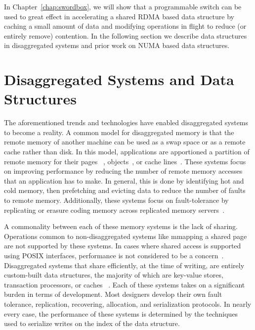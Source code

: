 \documentclass[12pt]{ucsddissertation}
\begin{document}
In Chapter~\ref{chap:swordbox}, we will show that a programmable switch can be used to great effect
in accelerating a shared RDMA based data structure by caching a small amount of data and modifying
operations in flight to reduce (or entirely remove) contention. In the following section we describe
data structures in disaggregated systems and prior work on NUMA based data structures.




\section{Disaggregated Systems and Data Structures}
\label{sec:disaggregated-data-structures}


The aforementioned trends and technologies have enabled disaggregated systems to become a reality. A
common model for disaggregated memory is that the remote memory of another machine can be used as a
swap space or as a remote cache rather than disk. In this model, applications are apportioned a
partition of remote memory for their pages
~\cite{fastswap,infiniswap,hydra,blade-server,leap,legoos}, objects~\cite{aifm,carbink}, or cache
lines~\cite{kona}. These systems focus on improving performance by reducing the number of remote
memory accesses that an application has to make. In general, this is done by identifying hot and
cold memory, then prefetching and evicting data to reduce the number of faults to remote memory.
Additionally, these systems focus on fault-tolerance by replicating or erasure coding memory across
replicated memory servers~\cite{hydra}.

A commonality between each of these memory systems is the lack of sharing. Operations common to
non-disaggregated systems like mmapping a shared page are not supported by these systems. In cases
where shared access is supported using POSIX interfaces, performance is not considered to be a
concern~\cite{regions}. Disaggregated systems that share efficiently, at the time of writing, are
entirely custom-built data structures, the majority of which are key-value stores, transaction
processors, or caches~\cite{rolex,fusee,ditto,clover,sherman,ford,race} . Each of these systems
takes on a significant burden in terms of development. Most designers develop their own fault
tolerance, replication, recovering, allocation, and serialization protocols. In nearly every case,
the performance of these systems is determined by the techniques used to serialize writes on the
index of the data structure.
\end{document}

